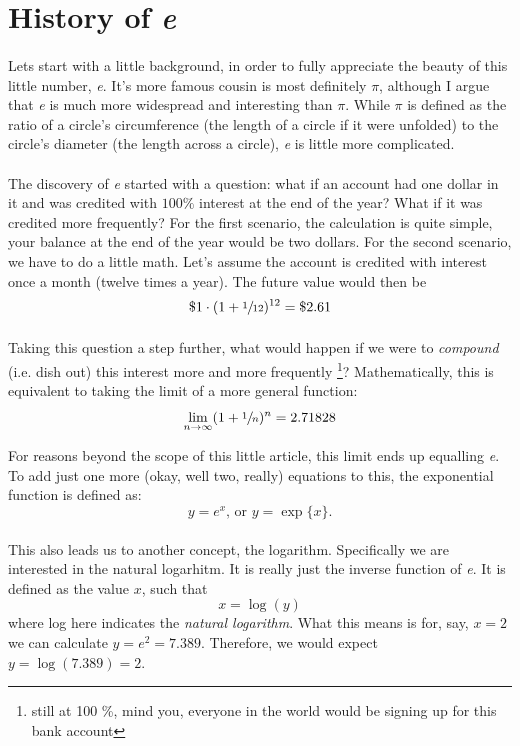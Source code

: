 \documentclass{cup-pan}
\begin{document}
\section{History of \textit{e}}
\label{sec:history}
\paragraph{}
Lets start with a little background, in order to fully appreciate the beauty of this little number, \textit{e}. It's more famous cousin is most definitely $ \pi$, although I argue that \textit{e} is much more widespread and interesting than $ \pi$. While $\pi$ is defined as the ratio of a circle's circumference (the length of a circle if it were unfolded) to the circle's diameter (the length across a circle), \textit{e} is little more complicated.

\paragraph{}
The discovery of \textit{e} started with a question: what if an account had one dollar in it and was credited with $100 \%$ interest at the end of the year? What if it was credited more frequently? For the first scenario, the calculation is quite simple, your balance at the end of the year would be two dollars. For the second scenario, we have to do a little math. Let's assume the account is credited with interest once a month (twelve times a year). The future value would then be $$ \$1 \cdot (1 + \sfrac{1}{12} )^{12} = \$ 2.61$$

\paragraph{}
Taking this question a step further, what would happen if we were to \textit{compound} (i.e. dish out) this interest more and more frequently \footnote{still at 100 \%, mind you, everyone in the world would be signing up for this bank account}? Mathematically, this is equivalent to taking the limit of a more general function:
$$\lim_{n \to \infty} (1 + \sfrac{1}{n})^{n} = 2.71828$$

For reasons beyond the scope of this little article, this limit ends up equalling \textit{e}. To add just one more (okay, well two, really) equations to this, the exponential function is defined as: $$y = \textit{e}^{x} \text{, or } y = \exp\{x\}.$$

\paragraph{}
This also leads us to another concept, the logarithm. Specifically we are interested in the natural logarhitm. It is really just the inverse function of \textit{e}.  It is defined as the value $x$, such that $$x = \log ( y )$$ where log here indicates the \textit{natural logarithm}. What this means is for, say, $x = 2$ we can calculate $y = \textit{e}^2 = 7.389.$ Therefore, we would expect $y = \log (7.389) = 2$.
\end{document}
